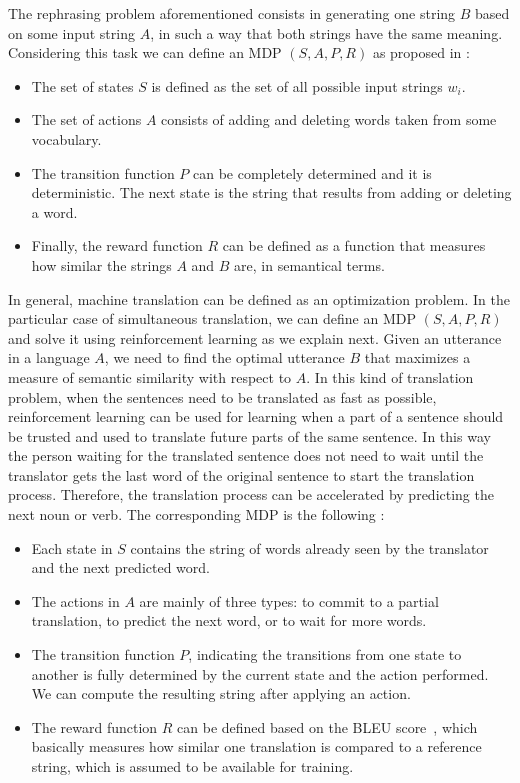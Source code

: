 The rephrasing problem aforementioned consists in generating one string $B$ based on some input string $A$, in such a way that both strings have the same meaning. Considering this task we can define an MDP $(S,A,P,R)$ as proposed in :
\begin{itemize}
\item The set of states $S$ is defined as the set of all possible input strings $w_i$. 
\item The set of actions $A$ consists of adding and deleting words taken from some vocabulary. 
\item The transition function $P$ can be completely determined and it is deterministic. The next state is the string that results from adding or deleting a word. 
\item Finally, the reward function $R$ can be defined as a function that measures how similar the strings $A$ and $B$ are, in semantical terms. 
\end{itemize}  
In general, machine translation can be defined as an optimization problem. In the particular case of simultaneous translation, we can define an MDP $(S,A,P,R)$ and solve it using reinforcement learning as we explain next. Given an utterance in a language $A$, we need to find the optimal utterance $B$ that maximizes a measure of semantic similarity with respect to $A$. In this kind of translation problem, when the sentences need to be translated as fast as possible, reinforcement learning can be used for learning when a part of a sentence should be trusted and used to translate future parts of the same sentence. In this way the person waiting for the translated sentence does not need to wait until the translator gets the last word of the original sentence to start the translation process. Therefore, the translation process can be accelerated by predicting the next noun or verb. The corresponding MDP is the following :
\begin{itemize}
\item Each state in $S$ contains the string of words already seen by the translator and the next predicted word.
\item The actions in $A$ are mainly of three types: to commit to a partial translation, to predict the next word, or to wait for more words.
\item The transition function $P$, indicating the transitions from one state to another is fully determined by the current state and the action performed. We can compute the resulting string after applying an action.
\item The reward function $R$ can be defined based on the BLEU score~, which basically measures how similar one translation is compared to a reference string, which is assumed to be available for training.
\end{itemize}
